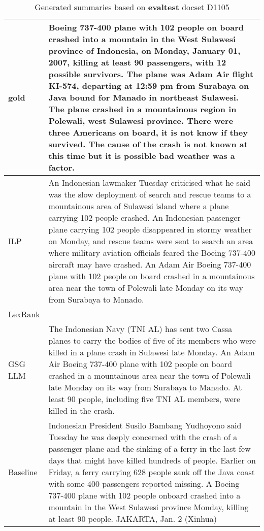 \begin{table*}[ht]
\centering
\caption{Generated summaries based on \textbf{evaltest} docset D1105}
\begin{tabular}{|l|p{13cm}|}
  \hline
 gold & Boeing 737-400 plane with 102 people on board crashed into a mountain in the West Sulawesi province of Indonesia, on Monday, January 01, 2007, killing at least 90 passengers, with 12 possible survivors. The plane was Adam Air flight KI-574, departing at 12:59 pm from Surabaya on Java bound for Manado in northeast Sulawesi. The plane crashed in a mountainous region in Polewali, west Sulawesi province. There were three Americans on board, it is not know if they survived. The cause of the crash is not known at this time but it is possible bad weather was a factor. \\
 \hline
ILP & An Indonesian lawmaker Tuesday criticised what he said was the slow deployment of search and rescue teams to a mountainous area of Sulawesi island where a plane carrying 102 people crashed.
An Indonesian passenger plane carrying 102 people disappeared in stormy weather on Monday, and rescue teams were sent to search an area where military aviation officials feared the Boeing 737-400 aircraft may have crashed.
An Adam Air Boeing 737-400 plane with 102 people on board crashed in a mountainous area near the town of Polewali late Monday on its way from Surabaya to Manado.
 \\
  \hline
 LexRank & 
 \\
 \hline
 GSG LLM & The Indonesian Navy (TNI AL) has sent two Cassa planes to carry the bodies of five of its members who were killed in a plane crash in Sulawesi late Monday. 
 An Adam Air Boeing 737-400 plane with 102 people on board crashed in a mountainous area near the town of Polewali late Monday on its way from Surabaya to Manado. 
 At least 90 people, including five TNI AL members, were killed in the crash.
 \\
 \hline
 Baseline & Indonesian President Susilo Bambang Yudhoyono said Tuesday he was deeply concerned with the crash of a passenger plane and the sinking of a ferry in the last few days that might have killed hundreds of people.
Earlier on Friday, a ferry carrying 628 people sank off the Java coast with some 400 passengers reported missing.
A Boeing 737-400 plane with 102 people onboard crashed into a mountain in the West Sulawesi province Monday, killing at least 90 people.
JAKARTA, Jan. 2 (Xinhua)
 \\
 \hline
\end{tabular}
\label{tab:error_analysis_evaltest}
\end{table*}